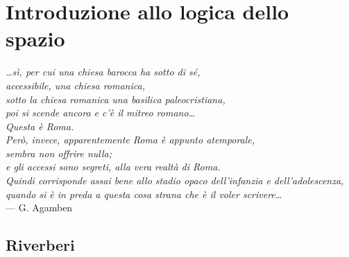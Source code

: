 
\chapter{Introduzione allo logica dello spazio}
\label{cap:spazio}

\vfill

\begin{flushright}{\slshape
  …sì, per cui una chiesa barocca ha sotto di sé, \\
  accessibile, una chiesa romanica, \\
  sotto la chiesa romanica una basilica paleocristiana, \\
  poi si scende ancora e c’è il mitreo romano… \\
  Questa è Roma. \\
  Però, invece, apparentemente Roma è appunto atemporale, \\
  sembra non offrire nulla; \\
  e gli accessi sono segreti, alla vera realtà di Roma. \\
  Quindi corrisponde assai bene allo stadio opaco dell’infanzia e dell’adolescenza, \\
  quando si è in preda a questa cosa strana che è il voler scrivere…} \\ \medskip
    --- G. Agamben
\end{flushright}



\section{Riverberi}

